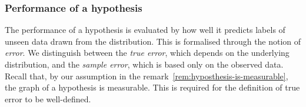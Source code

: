 %
%
%
%



\subsubsection{Performance of a hypothesis}

The performance of a hypothesis is evaluated by how well it predicts labels of unseen data drawn from the distribution.
This is formalised through the notion of \emph{error}.
We distinguish between the \emph{true error}, which depends on the underlying distribution, and the \emph{sample error}, which is based only on the observed data. Recall that, by our assumption in the remark~\ref{rem:hyposthesis-is-measurable}, the graph of a hypothesis is measurable. This is required for the definition of true error to be well-defined.

